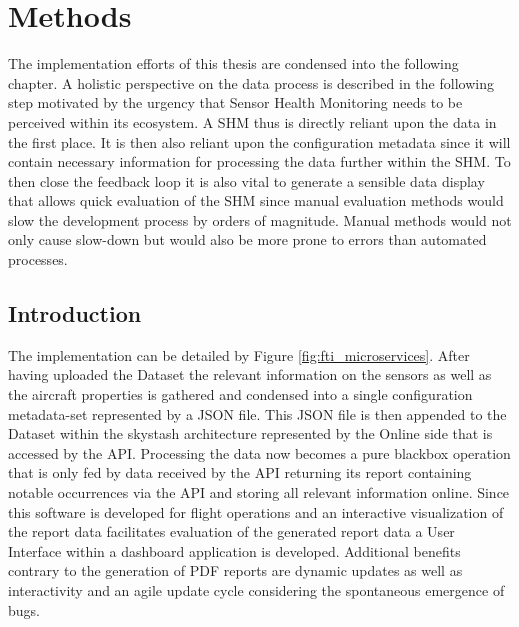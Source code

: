 %

\chapter{Methods}
\label{chap:4-methods}
The implementation efforts of this thesis are condensed into the following chapter. A holistic perspective on the data process is described in the following step motivated by the urgency that Sensor Health Monitoring needs to be perceived within its ecosystem. A SHM thus is directly reliant upon the data in the first place. It is then also reliant upon the configuration metadata since it will contain necessary information for processing the data further within the SHM. To then close the feedback loop it is also vital to generate a sensible data display that allows quick evaluation of the SHM since manual evaluation methods would slow the development process by orders of magnitude. Manual methods would not only cause slow-down but would also be more prone to errors than automated processes.\cite{barchard_preventing_2011}

\section{Introduction}

The implementation can be detailed by Figure \ref{fig:fti_microservices}. After having uploaded the Dataset the relevant information on the sensors as well as the aircraft properties is gathered and condensed into a single configuration metadata-set represented by a JSON file. This JSON file is then appended to the Dataset within the skystash architecture represented by the Online side that is accessed by the API. Processing the data now becomes a pure blackbox operation that is only fed by data received by the API returning its report containing notable occurrences via the API and storing all relevant information online. Since this software is developed for flight operations and an interactive visualization of the report data facilitates evaluation of the generated report data a User Interface within a dashboard application is developed. Additional benefits contrary to the generation of PDF reports are dynamic updates as well as interactivity and an agile update cycle considering the spontaneous emergence of bugs.



